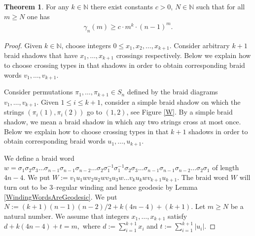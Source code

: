 \documentclass[11pt]{amsart}
\theoremstyle{plain}
\theoremstyle{definition}
\newtheorem{Theorem}{Theorem}[section]
\numberwithin{equation}{section}
\begin{document}
\begin{Theorem}\label{GeodesicsGenerator}
For any $k \in \mathbb{N}$ there exist constants $c>0$, $N \in \mathbb{N}$ such that for all $m \geq N$ one has
\begin{align*}
\gamma_n(m) \geq c\cdot m^k \cdot (n-1)^m.
\end{align*}
\end{Theorem}
\begin{proof}
Given $k \in \mathbb{N}$, choose integers $0 \leq x_1, x_2, \ldots, x_{k+1}$. Consider arbitrary $k+1$ braid shadows that have $x_1, \ldots, x_{k+1}$ crossings respectively. Below we explain how to choose crossing types in that shadows in order to obtain corresponding braid words $v_1, \ldots, v_{k+1}$. 

Consider permutations $\pi_1, \ldots, \pi_{k+1} \in S_n$ defined by the braid diagrams $v_1, \ldots, v_{k+1}$. Given $1 \leq i \leq k+1$, consider a simple braid shadow on which the strings $(\pi_i(1), \pi_i(2))$ go to $(1,2)$, see Figure \ref{W}. By a simple braid shadow, we mean a braid shadow in which any two strings cross at most once. Below we explain how to choose crossing types in that $k+1$ shadows in order to obtain corresponding braid words $u_1, \ldots, u_{k+1}$.

We define a braid word $w = \sigma_1\sigma_2\sigma_3\ldots \sigma_{n-1}\sigma_{n-1}\sigma_{n-2} \ldots \sigma_2\sigma_1^{-1}\sigma_1^{-1}\sigma_2\sigma_3 \ldots \sigma_{n-1}\sigma_{n-1}\sigma_{n-2} \ldots \sigma_2\sigma_1$ of length $4n-4$. We put $W := v_1u_1w v_2u_2w v_3u_3w \ldots v_ku_kw v_{k+1}u_{k+1}.$
The braid word $W$ will turn out to be $3$--regular winding and hence geodesic by Lemma \ref{WindingWordsAreGeodesic}. We put $N := (k+1)(n-1)(n-2)/2 + k(4n-4) + (k+1)$. Let $m \geq N$ be a natural number. We assume that integers $x_1, \ldots, x_{k+1}$ satisfy $d + k(4n-4) + t = m,$ where $d := \sum_{i=1}^{k+1} x_i$ and $t := \sum_{i=1}^{k+1} |u_i|$. 



\end{proof}
\end{document}
